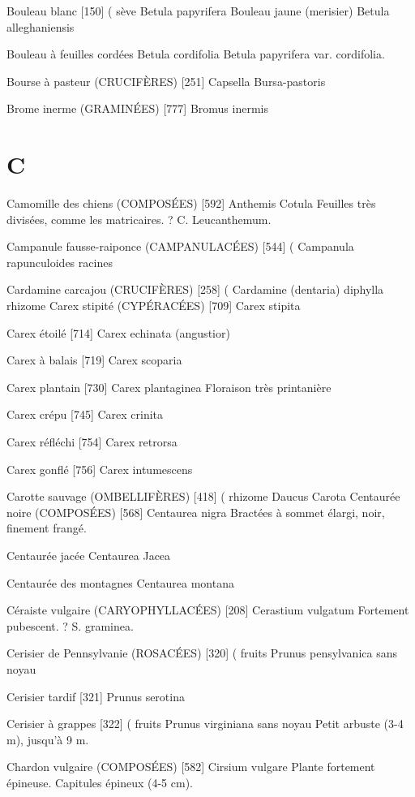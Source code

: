 \documentclass[book,12pt,a4paper,onecolumn,openany]{memoir}
\begin{document}
Bouleau blanc  [150]							( sève
				Betula papyrifera
Bouleau jaune (merisier)
				Betula alleghaniensis

Bouleau à feuilles cordées
				Betula cordifolia
    Betula papyrifera var. cordifolia.

Bourse à pasteur (CRUCIFÈRES)  [251]
				Capsella Bursa-pastoris

Brome inerme (GRAMINÉES)  [777]
				Bromus inermis

\chapter*{C}

Camomille des chiens (COMPOSÉES)  [592]
				Anthemis Cotula
Feuilles très divisées, comme les matricaires. ? C. Leucanthemum.

Campanule fausse-raiponce (CAMPANULACÉES)  [544]		(
				Campanula rapunculoides			racines

Cardamine carcajou (CRUCIFÈRES)  [258]				 (
				Cardamine (dentaria) diphylla	       rhizome
Carex stipité (CYPÉRACÉES)  [709]
				Carex stipita

Carex étoilé  [714]
				Carex echinata (angustior)

Carex à balais  [719]
				Carex scoparia

Carex plantain  [730]
				Carex plantaginea
Floraison très printanière

Carex crépu  [745]
				Carex crinita

Carex réfléchi  [754]
				Carex retrorsa

Carex gonflé  [756]
				Carex intumescens

Carotte sauvage (OMBELLIFÈRES)  [418]			( rhizome
				Daucus Carota
Centaurée noire (COMPOSÉES)  [568]
				Centaurea nigra
Bractées à sommet élargi, noir, finement frangé.

Centaurée jacée
				Centaurea Jacea

Centaurée des montagnes
				Centaurea montana

Céraiste vulgaire (CARYOPHYLLACÉES)  [208]
				Cerastium vulgatum
Fortement pubescent. ? S. graminea.

Cerisier de Pennsylvanie (ROSACÉES)  [320]		( fruits
				Prunus pensylvanica			sans noyau

Cerisier tardif  [321]
				Prunus serotina

Cerisier à grappes  [322]						( fruits
				Prunus virginiana			sans noyau
Petit arbuste (3-4 m), jusqu’à 9 m.

Chardon vulgaire (COMPOSÉES)  [582]
				Cirsium vulgare
Plante fortement épineuse. Capitules épineux (4-5 cm).
\end{document}
